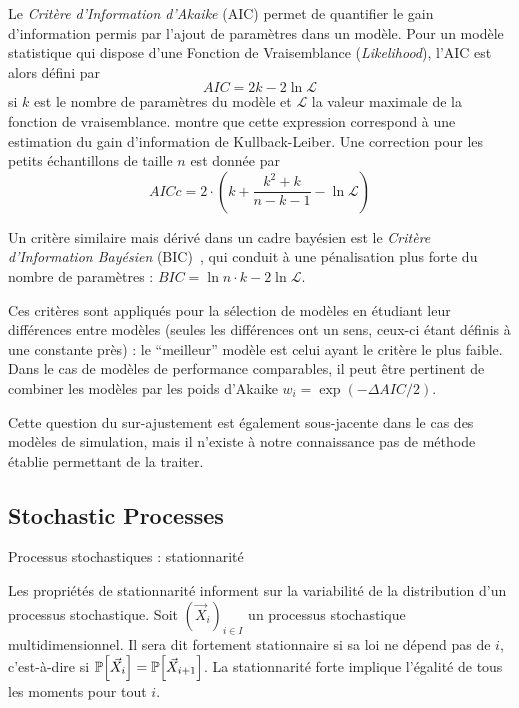 Le \emph{Critère d'Information d'Akaike} (AIC) permet de quantifier le gain d'information permis par l'ajout de paramètres dans un modèle. Pour un modèle statistique qui dispose d'une Fonction de Vraisemblance (\emph{Likelihood}), l'AIC est alors défini par
\[
AIC = 2k - 2 \ln{\mathcal{L}}
\]
si $k$ est le nombre de paramètres du modèle et $\mathcal{L}$ la valeur maximale de la fonction de vraisemblance. \cite{akaike1998information} montre que cette expression correspond à une estimation du gain d'information de Kullback-Leiber. Une correction pour les petits échantillons de taille $n$ est donnée par
\[
AICc = 2\cdot\left(k + \frac{k^2 + k}{n-k -1} - \ln{\mathcal{L}}\right)
\]

Un critère similaire mais dérivé dans un cadre bayésien est le \emph{Critère d'Information Bayésien} (BIC)~\cite{burnham2003model}, qui conduit à une pénalisation plus forte du nombre de paramètres : $BIC = \ln n \cdot k - 2 \ln{\mathcal{L}}$.


Ces critères sont appliqués pour la sélection de modèles en étudiant leur différences entre modèles (seules les différences ont un sens, ceux-ci étant définis à une constante près) : le ``meilleur'' modèle est celui ayant le critère le plus faible. Dans le cas de modèles de performance comparables, il peut être pertinent de combiner les modèles par les poids d'Akaike $w_i = \exp (- \Delta AIC / 2)$.


Cette question du sur-ajustement est également sous-jacente dans le cas des modèles de simulation, mais il n'existe à notre connaissance pas de méthode établie permettant de la traiter.



\subsection*{Stochastic Processes}{Processus stochastiques : stationnarité}


Les propriétés de stationnarité informent sur la variabilité de la distribution d'un processus stochastique. Soit $(\vec{X}_i)_{i\in I}$ un processus stochastique multidimensionnel. Il sera dit fortement stationnaire si sa loi ne dépend pas de $i$, c'est-à-dire si $\operatorname{\mathbb{P}}\!\left[\vec{X}_i\right] = \operatorname{\mathbb{P}}\!\left[\vec{X}_{i+1}\right]$. La stationnarité forte implique l'égalité de tous les moments pour tout $i$.


